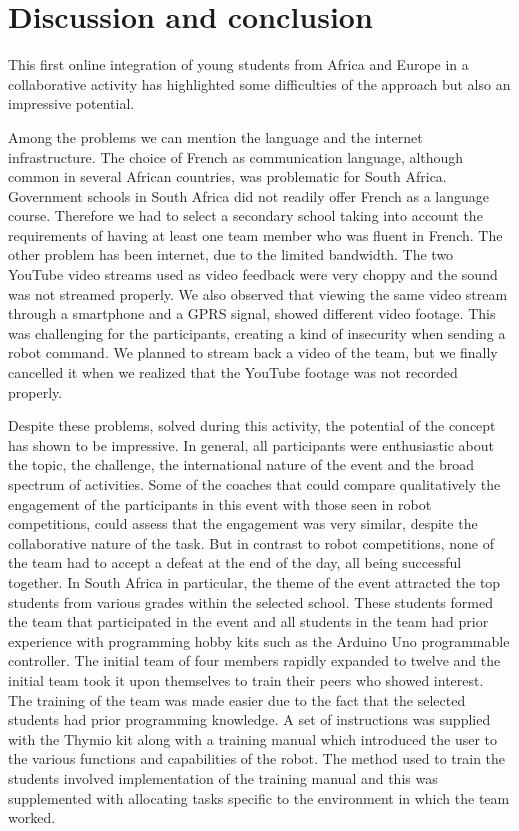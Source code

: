 \documentclass{intech-journal}
\begin{document}
\section{Discussion and conclusion}

This first online integration of young students from Africa and Europe in a collaborative activity has highlighted some difficulties of the approach but also an impressive potential.

Among the problems we can mention the language and the internet infrastructure.
The choice of French as communication language, although common in several African countries, was problematic for South Africa.
Government schools in South Africa did not readily offer French as a language course.
Therefore we had to select a secondary school taking into account the requirements of having at least one team member who was fluent in French. 
The other problem has been internet, due to the limited bandwidth. 
The two YouTube video streams used as video feedback were very choppy and the sound was not streamed properly.
We also observed that viewing the same video stream through a smartphone and a GPRS signal, showed different video footage. 
This was challenging for the participants, creating a kind of insecurity when sending a robot command.
We planned to stream back a video of the team, but we finally cancelled it when we realized that the YouTube footage was not recorded properly.

Despite these problems, solved during this activity, the potential of the concept has shown to be impressive.
In general, all participants were enthusiastic about the topic, the challenge, the international nature of the event and the broad spectrum of activities. 
Some of the coaches that could compare qualitatively the engagement of the participants in this event with those seen in robot competitions, could assess that the engagement was very similar, despite the collaborative nature of the task. 
But in contrast to robot competitions, none of the team had to accept a defeat at the end of the day, all being successful together. 
In South Africa in particular, the theme of the event attracted the top students from various grades within the selected school. 
These students formed the team that participated in the event and all students in the team had prior experience with programming hobby kits such as the Arduino Uno programmable controller. 
The initial team of four members rapidly expanded to twelve and the initial team took it upon themselves to train their peers who showed interest. 
The training of the team was made easier due to the fact that the selected students had prior programming knowledge. 
A set of instructions was supplied with the Thymio kit along with a training manual which introduced the user to the various functions and capabilities of the robot. 
The method used to train the students involved implementation of the training manual and this was supplemented with allocating tasks specific to the environment in which the team worked. 
\end{document}
